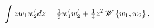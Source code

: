 \[\int zw_{1}w^{\prime}_{2}dz=\tfrac{1}{2}w^{\prime}_{1}w^{\prime}_{2}+\tfrac{1}%
{4}z^{2}\mathop{\mathscr{W}\/}\nolimits\left\{w_{1},w_{2}\right\},\]